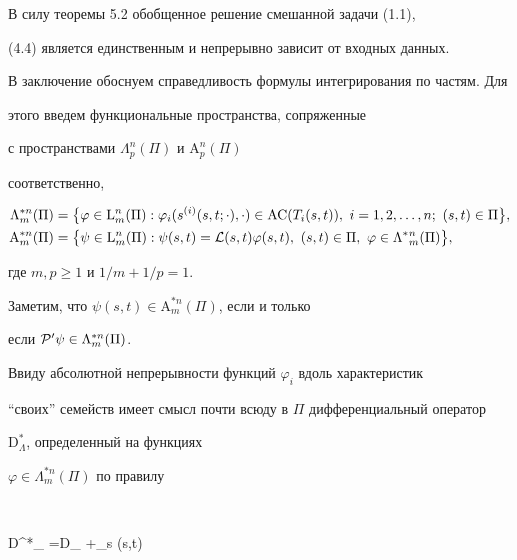 В силу теоремы 5.2 обобщенное решение смешанной задачи (1.1),


(4.4) является единственным и непрерывно зависит от входных данных.





В заключение обоснуем справедливость формулы интегрирования по частям. Для 


этого введем функциональные пространства, сопряженные


с пространствами $\Lambda_{p}^n ({\Pi})$ и $\mathrm A_{p}^n ({\Pi})$


соответственно,


\begin{align*} 


\Lambda^{*n}_m ({\Pi})&=\big\{ \varphi \in \mathrm L^n_m ({\Pi}):


\varphi_i (s^{(i)} (s,t; \cdot), \cdot) \in {\mathrm{AC}} (T_i (s,t)),


\ i=1,2,\dotsc,n;\ (s,t) \in {\Pi} \big\}, \\


%


{\mathrm A}^{*n}_m ({\Pi})&=\big\{ \psi \in \mathrm L^n_m ({\Pi}):


\psi (s,t)={\cal L} (s,t) \varphi (s,t),\ (s,t) \in {\Pi},\ \varphi \in 


\Lambda^*{}^n_m ({\Pi}) \big\},


\end{align*}


где $m,p \geq 1$ и ${1}/{m}+{1}/p=1$.





Заметим, что $\psi (s,t) \in {\mathrm A}^{*n}_m ({\Pi})$, если и только


если ${\cal P}^{\prime}\psi \in \Lambda^{*n}_m ({\Pi})$.





Ввиду абсолютной непрерывности функций $\varphi_i$ вдоль характеристик


``своих'' семейств имеет смысл почти всюду в $\Pi$ дифференциальный оператор


${\mathrm D}^*_{\Lambda}$, определенный на функциях 


$\varphi \in \Lambda^{*n}_m (\Pi)$ по правилу


$$


{\mathrm D}^*_{\Lambda} \varphi={\mathrm D}_{\Lambda} \varphi+\Lambda_s (s,t) 


